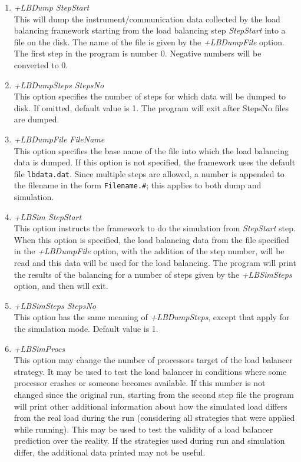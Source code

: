 \begin{enumerate}
\item {\em +LBDump StepStart}\\
        This will dump the instrument/communication data collected by the load balancing framework
	starting from the load balancing step {\em StepStart} into a file on the disk. The name of the file
	is given by the {\em +LBDumpFile} option. The first step in the program is number 0. Negative
	numbers will be converted to 0.
\item {\em +LBDumpSteps StepsNo}\\
        This option specifies the number of steps for which data will be dumped to disk. If omitted, default value is 1.
	The program will exit after StepsNo files are dumped.
\item {\em +LBDumpFile FileName}\\
	This option specifies the base name of the file into which the load balancing data is dumped. If this
	option is not specified, the framework uses the default file {\tt lbdata.dat}. Since multiple steps are allowed,
	a number is appended to the filename in the form {\tt Filename.\#}; this applies to both dump and
	simulation.
\item {\em +LBSim StepStart}\\
	This option instructs the framework to do the simulation from {\em StepStart} step.
	When this option is specified, the load balancing data from the file specified in the {\em +LBDumpFile}
	option, with the addition of the step number, will be read and this data
	will be used for the load balancing. The program will print the results
	of the balancing for a number of steps given by the {\em +LBSimSteps} option, and then will exit.
\item {\em +LBSimSteps StepsNo}\\
        This option has the same meaning of {\em +LBDumpSteps}, except that apply for the simulation mode.
	Default value is 1.
\item {\em +LBSimProcs}\\
        This option may change the number of processors target of the load balancer strategy. It may be used to test
	the load balancer in conditions where some processor crashes or someone becomes available. If this number is not
	changed since the original run, starting from the second step file the program will print other additional
	information about how the simulated load differs from the real load during the run (considering all
	strategies that were applied while running). This may be used to test the validity of a load balancer
	prediction over the reality. If the strategies used during run and simulation differ, the additional data
	printed may not be useful.
\end{enumerate}
